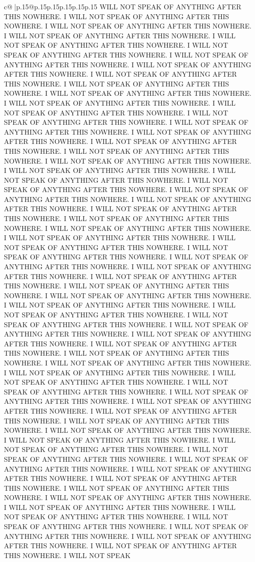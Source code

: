 \documentclass{article}
\begin{document}
{\begin{supertabular}{c@{$\;$}|p{.15\linewidth}@{}p{.15\linewidth}p{.15\linewidth}p{.15\linewidth}p{.15\linewidth}p{.15\linewidth}}
{{{WILL NOT SPEAK OF ANYTHING AFTER THIS NOWHERE. I WILL NOT SPEAK OF ANYTHING AFTER THIS NOWHERE. I WILL NOT SPEAK OF ANYTHING AFTER THIS NOWHERE. I WILL NOT SPEAK OF ANYTHING AFTER THIS NOWHERE. I WILL NOT SPEAK OF ANYTHING AFTER THIS NOWHERE. I WILL NOT SPEAK OF ANYTHING AFTER THIS NOWHERE. I WILL NOT SPEAK OF ANYTHING AFTER THIS NOWHERE. I WILL NOT SPEAK OF ANYTHING AFTER THIS NOWHERE. I WILL NOT SPEAK OF ANYTHING AFTER THIS NOWHERE. I WILL NOT SPEAK OF ANYTHING AFTER THIS NOWHERE. I WILL NOT SPEAK OF ANYTHING AFTER THIS NOWHERE. I WILL NOT SPEAK OF ANYTHING AFTER THIS NOWHERE. I WILL NOT SPEAK OF ANYTHING AFTER THIS NOWHERE. I WILL NOT SPEAK OF ANYTHING AFTER THIS NOWHERE. I WILL NOT SPEAK OF ANYTHING AFTER THIS NOWHERE. I WILL NOT SPEAK OF ANYTHING AFTER THIS NOWHERE. I WILL NOT SPEAK OF ANYTHING AFTER THIS NOWHERE. I WILL NOT SPEAK OF ANYTHING AFTER THIS NOWHERE. I WILL NOT SPEAK OF ANYTHING AFTER THIS NOWHERE. I WILL NOT SPEAK OF ANYTHING AFTER THIS NOWHERE. I WILL NOT SPEAK OF ANYTHING AFTER THIS NOWHERE. I WILL NOT SPEAK OF ANYTHING AFTER THIS NOWHERE. I WILL NOT SPEAK OF ANYTHING AFTER THIS NOWHERE. I WILL NOT SPEAK OF ANYTHING AFTER THIS NOWHERE. I WILL NOT SPEAK OF ANYTHING AFTER THIS NOWHERE. I WILL NOT SPEAK OF ANYTHING AFTER THIS NOWHERE. I WILL NOT SPEAK OF ANYTHING AFTER THIS NOWHERE. I WILL NOT SPEAK OF ANYTHING AFTER THIS NOWHERE. I WILL NOT SPEAK OF ANYTHING AFTER THIS NOWHERE. I WILL NOT SPEAK OF ANYTHING AFTER THIS NOWHERE. I WILL NOT SPEAK OF ANYTHING AFTER THIS NOWHERE. I WILL NOT SPEAK OF ANYTHING AFTER THIS NOWHERE. I WILL NOT SPEAK OF ANYTHING AFTER THIS NOWHERE. I WILL NOT SPEAK OF ANYTHING AFTER THIS NOWHERE. I WILL NOT SPEAK OF ANYTHING AFTER THIS NOWHERE. I WILL NOT SPEAK OF ANYTHING AFTER THIS NOWHERE. I WILL NOT SPEAK OF ANYTHING AFTER THIS NOWHERE. I WILL NOT SPEAK OF ANYTHING AFTER THIS NOWHERE. I WILL NOT SPEAK OF ANYTHING AFTER THIS NOWHERE. I WILL NOT SPEAK OF ANYTHING AFTER THIS NOWHERE. I WILL NOT SPEAK OF ANYTHING AFTER THIS NOWHERE. I WILL NOT SPEAK OF ANYTHING AFTER THIS NOWHERE. I WILL NOT SPEAK OF ANYTHING AFTER THIS NOWHERE. I WILL NOT SPEAK OF ANYTHING AFTER THIS NOWHERE. I WILL NOT SPEAK OF ANYTHING AFTER THIS NOWHERE. I WILL NOT SPEAK OF ANYTHING AFTER THIS NOWHERE. I WILL NOT SPEAK OF ANYTHING AFTER THIS NOWHERE. I WILL NOT SPEAK OF ANYTHING AFTER THIS NOWHERE. I WILL NOT SPEAK OF ANYTHING AFTER THIS NOWHERE. I WILL NOT SPEAK OF ANYTHING AFTER THIS NOWHERE. I WILL NOT SPEAK OF ANYTHING AFTER THIS NOWHERE. I WILL NOT SPEAK OF ANYTHING AFTER THIS NOWHERE. I WILL NOT SPEAK OF ANYTHING AFTER THIS NOWHERE. I WILL NOT SPEAK OF ANYTHING AFTER THIS NOWHERE. I WILL NOT SPEAK OF ANYTHING AFTER THIS NOWHERE. I WILL NOT SPEAK OF ANYTHING AFTER THIS NOWHERE. I WILL NOT SPEAK OF ANYTHING AFTER THIS NOWHERE. I WILL NOT SPEAK OF ANYTHING AFTER THIS NOWHERE. I WILL NOT SPEAK OF ANYTHING AFTER THIS NOWHERE. I WILL NOT SPEAK OF ANYTHING AFTER THIS NOWHERE. I WILL NOT SPEAK OF ANYTHING AFTER THIS NOWHERE. I WILL NOT SPEAK OF ANYTHING AFTER THIS NOWHERE. I WILL NOT SPEAK OF ANYTHING AFTER THIS NOWHERE. I WILL NOT SPEAK OF ANYTHING AFTER THIS NOWHERE. I WILL NOT SPEAK OF ANYTHING AFTER THIS NOWHERE. I WILL NOT SPEAK }}}
\end{supertabular}}
\end{document}
